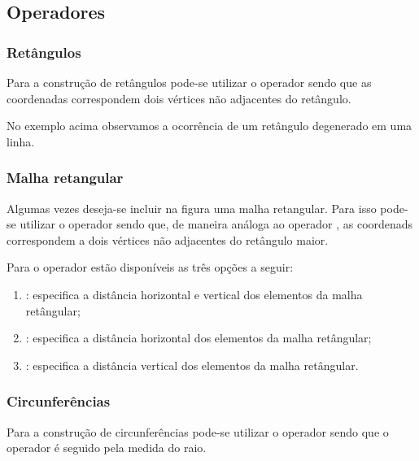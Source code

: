 \subsection{Operadores}
\subsubsection{Ret\^{a}ngulos}
Para a constru\c{c}\~{a}o de ret\^{a}ngulos pode-se utilizar o operador  sendo que as coordenadas correspondem dois v\'{e}rtices n\~{a}o adjacentes do ret\^{a}ngulo. \\

No exemplo acima observamos a ocorr\^{e}ncia de um ret\^{a}ngulo degenerado em uma linha.

\subsubsection{Malha retangular}
Algumas vezes deseja-se incluir na figura uma malha retangular. Para isso pode-se utilizar o operador  sendo que, de maneira an\'{a}loga ao operador , as coordenads correspondem a dois v\'{e}rtices n\~{a}o adjacentes do ret\^{a}ngulo maior. \\

Para o operador  est\~{a}o dispon\'{i}veis as tr\^{e}s op\c{c}\~{o}es a seguir:
\begin{enumerate}
    \item {}: especifica a dist\^{a}ncia horizontal e vertical dos elementos da malha ret\^{a}ngular;
    \item {}: especifica a dist\^{a}ncia horizontal dos elementos da malha ret\^{a}ngular;
    \item {}: especifica a dist\^{a}ncia vertical dos elementos da malha ret\^{a}ngular.
\end{enumerate}

\subsubsection{Circunfer\^{e}ncias}
Para a constru\c{c}\~{a}o de circunfer\^{e}ncias pode-se utilizar o operador  sendo que o operador \'{e} seguido pela medida do raio. \\

